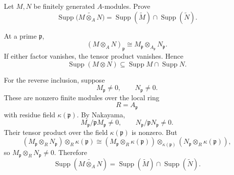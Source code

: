 \begin{problem}\label{prob:vi33-20}
Let \(M,N\) be finitely generated \(A\)-modules. Prove
\[
\operatorname{Supp}\bigl(\widetilde{M\otimes_A N}\bigr)
=
\operatorname{Supp}(\widetilde M)\cap\operatorname{Supp}(\widetilde N).
\]

\end{problem}

\ifdefined\FullProblemDossiers
\begin{solution}
At a prime \(\mathfrak p\),
\[
(M\otimes_A N)_{\mathfrak p}
\cong
M_{\mathfrak p}\otimes_{A_{\mathfrak p}}N_{\mathfrak p}.
\]
If either factor vanishes, the tensor product vanishes. Hence
\[
\operatorname{Supp}(M\otimes N)
\subseteq
\operatorname{Supp}M\cap\operatorname{Supp}N.
\]

For the reverse inclusion, suppose
\[
M_{\mathfrak p}\ne0,
\qquad
N_{\mathfrak p}\ne0.
\]
These are nonzero finite modules over the local ring
\[
R=A_{\mathfrak p}
\]
with residue field \(\kappa(\mathfrak p)\). By Nakayama,
\[
M_{\mathfrak p}/\mathfrak pM_{\mathfrak p}\ne0,
\qquad
N_{\mathfrak p}/\mathfrak pN_{\mathfrak p}\ne0.
\]
Their tensor product over the field \(\kappa(\mathfrak p)\) is nonzero. But
\[
(M_{\mathfrak p}\otimes_RN_{\mathfrak p})
\otimes_R\kappa(\mathfrak p)
\cong
(M_{\mathfrak p}\otimes_R\kappa(\mathfrak p))
\otimes_{\kappa(\mathfrak p)}
(N_{\mathfrak p}\otimes_R\kappa(\mathfrak p)),
\]
so \(M_{\mathfrak p}\otimes_RN_{\mathfrak p}\ne0\). Therefore
\[
\boxed{
\operatorname{Supp}(\widetilde{M\otimes_A N})
=
\operatorname{Supp}(\widetilde M)\cap\operatorname{Supp}(\widetilde N).
}
\]
\end{solution}
\fi
